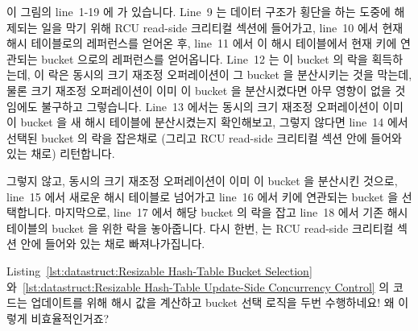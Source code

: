 이 그림의 line~1-19 에  가 있습니다.
Line~9 는 데이터 구조가 횡단을 하는 도중에 해제되는 일을 막기 위해 RCU
read-side 크리티컬 섹션에 들어가고, line~10 에서 현재 해시 테이블로의
레퍼런스를 얻어온 후, line~11 에서 이 해시 테이블에서 현재 키에 연관되는 bucket
으로의 레퍼런스를 얻어옵니다.
Line~12 는 이 bucket 의 락을 획득하는데, 이 락은 동시의 크기 재조정
오퍼레이션이 그 bucket 을 분산시키는 것을 막는데, 물론 크기 재조정 오퍼레이션이
이미 이 bucket 을 분산시켰다면 아무 영향이 없을 것임에도 불구하고 그렇습니다.
Line~13 에서는 동시의 크기 재조정 오퍼레이션이 이미 이 bucket 을 새 해시
테이블에 분산시켰는지 확인해보고, 그렇지 않다면 line~14 에서 선택된 bucket 의
락을 잡은채로 (그리고 RCU read-side 크리티컬 섹션 안에 들어와 있는 채로)
리턴합니다.

그렇지 않고, 동시의 크기 재조정 오퍼레이션이 이미 이 bucket 을 분산시킨 것으로,
line~15 에서 새로운 해시 테이블로 넘어가고 line~16 에서 키에 연관되는 bucket 을
선택합니다.
마지막으로, line~17 에서 해당 bucket 의 락을 잡고 line~18 에서 기존 해시
테이블의 bucket 을 위한 락을 놓아줍니다.
다시 한번,  는 RCU read-side 크리티컬 섹션 안에 들어와
있는 채로 빠져나가집니다.

\QuickQuiz{}
	Listing~\ref{lst:datastruct:Resizable Hash-Table Bucket Selection}
	와~\ref{lst:datastruct:Resizable Hash-Table Update-Side Concurrency Control}
	의 코드는 업데이트를 위해 해시 값을 계산하고 bucket 선택 로직을 두번
	수행하네요!
	왜 이렇게 비효율적인거죠?
	\iffalse


